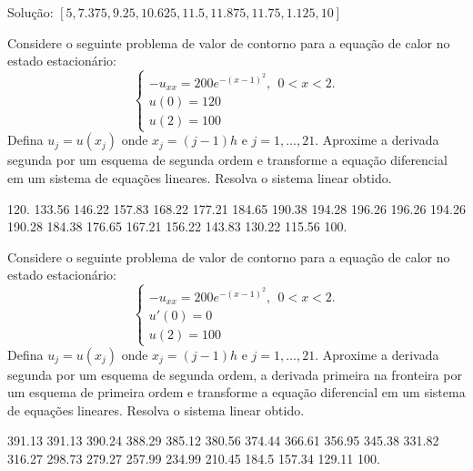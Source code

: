 \begin{Answer}
\begin{tiny}
Solução:  $[5, 7.375, 9.25, 10.625, 11.5, 11.875, 11.75, 1.125, 10]$
\end{tiny}
\end{Answer}


\begin{Exercise} Considere o seguinte problema de valor de contorno para a equação de calor no estado estacionário:
$$\left\{\begin{array}{l}-u_{xx}=200e^{-(x-1)^2},~~ 0<x<2.\\
u(0)=120\\
u(2)=100\end{array}
\right.
$$
Defina $u_j=u(x_j)$ onde $x_j={(j-1)}{h}$ e $j=1,\ldots,21$. Aproxime a derivada segunda por um esquema de segunda ordem e transforme a equação diferencial em um sistema de equações lineares. Resolva o sistema linear obtido.


\end{Exercise}
\begin{Answer}
  \begin{tiny}
120.    133.56    146.22    157.83    168.22    177.21    184.65    190.38    194.28    196.26    196.26    194.26    190.28    184.38    176.65    167.21  156.22    143.83    130.22    115.56    100.    
  \end{tiny}
\end{Answer}



\begin{Exercise} Considere o seguinte problema de valor de contorno para a equação de calor no estado estacionário:
$$\left\{\begin{array}{l}-u_{xx}=200e^{-(x-1)^2},~~ 0<x<2.\\
u'(0)=0\\
u(2)=100\end{array}
\right.
$$
Defina $u_j=u(x_j)$ onde $x_j={(j-1)}{h}$ e $j=1,\ldots,21$. Aproxime a derivada segunda por um esquema de segunda ordem, a derivada primeira na fronteira por um esquema de primeira ordem e transforme a equação diferencial em um sistema de equações lineares. Resolva o sistema linear obtido.
\end{Exercise}

\begin{Answer}
  \begin{tiny}
391.13    391.13    390.24    388.29    385.12    380.56    374.44    366.61    356.95    345.38    331.82    316.27    298.73    279.27    257.99    234.99    210.45    184.5    157.34    129.11    100.    
  \end{tiny}
\end{Answer}


